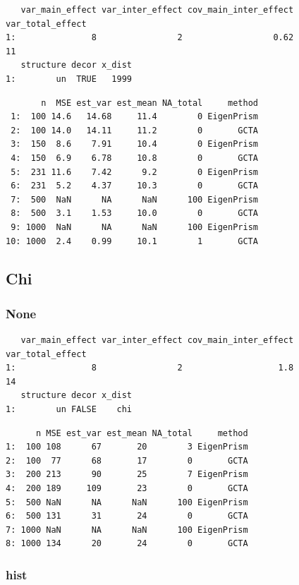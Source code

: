 \documentclass[]{article}
\begin{document}
\begin{verbatim}
   var_main_effect var_inter_effect cov_main_inter_effect var_total_effect
1:               8                2                  0.62               11
   structure decor x_dist
1:        un  TRUE   1999
\end{verbatim}

\begin{verbatim}
       n  MSE est_var est_mean NA_total     method
 1:  100 14.6   14.68     11.4        0 EigenPrism
 2:  100 14.0   14.11     11.2        0       GCTA
 3:  150  8.6    7.91     10.4        0 EigenPrism
 4:  150  6.9    6.78     10.8        0       GCTA
 5:  231 11.6    7.42      9.2        0 EigenPrism
 6:  231  5.2    4.37     10.3        0       GCTA
 7:  500  NaN      NA      NaN      100 EigenPrism
 8:  500  3.1    1.53     10.0        0       GCTA
 9: 1000  NaN      NA      NaN      100 EigenPrism
10: 1000  2.4    0.99     10.1        1       GCTA
\end{verbatim}

\subsection{Chi}\label{chi}

\subsubsection{None}\label{none-1}

\begin{verbatim}
   var_main_effect var_inter_effect cov_main_inter_effect var_total_effect
1:               8                2                   1.8               14
   structure decor x_dist
1:        un FALSE    chi
\end{verbatim}

\begin{verbatim}
      n MSE est_var est_mean NA_total     method
1:  100 108      67       20        3 EigenPrism
2:  100  77      68       17        0       GCTA
3:  200 213      90       25        7 EigenPrism
4:  200 189     109       23        0       GCTA
5:  500 NaN      NA      NaN      100 EigenPrism
6:  500 131      31       24        0       GCTA
7: 1000 NaN      NA      NaN      100 EigenPrism
8: 1000 134      20       24        0       GCTA
\end{verbatim}

\subsubsection{hist}\label{hist-1}
\end{document}
